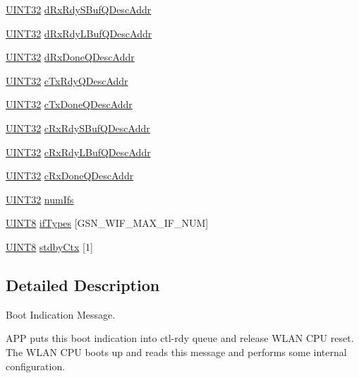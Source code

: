 \begin{DoxyCompactItemize}
\item 
\hyperlink{a00660_gae1e6edbbc26d6fbc71a90190d0266018}{UINT32} \hyperlink{a00348_ab547f820597f1b1f7cbfdd7393569c12}{dRxRdySBufQDescAddr}
\item 
\hyperlink{a00660_gae1e6edbbc26d6fbc71a90190d0266018}{UINT32} \hyperlink{a00348_a26310480a4f804ddac47c8036ed576a0}{dRxRdyLBufQDescAddr}
\item 
\hyperlink{a00660_gae1e6edbbc26d6fbc71a90190d0266018}{UINT32} \hyperlink{a00348_ab8fef41094b77d4a751980b345341c36}{dRxDoneQDescAddr}
\item 
\hyperlink{a00660_gae1e6edbbc26d6fbc71a90190d0266018}{UINT32} \hyperlink{a00348_a1542d73344b14a84e7f710c4de9bb8a7}{cTxRdyQDescAddr}
\item 
\hyperlink{a00660_gae1e6edbbc26d6fbc71a90190d0266018}{UINT32} \hyperlink{a00348_a78a51b81650e81f8eadc7c11f49dcf0b}{cTxDoneQDescAddr}
\item 
\hyperlink{a00660_gae1e6edbbc26d6fbc71a90190d0266018}{UINT32} \hyperlink{a00348_a4c1ebbd82b71958696f47604eb581d7c}{cRxRdySBufQDescAddr}
\item 
\hyperlink{a00660_gae1e6edbbc26d6fbc71a90190d0266018}{UINT32} \hyperlink{a00348_a8abf8636a4f60a8f51ea8857ade542d5}{cRxRdyLBufQDescAddr}
\item 
\hyperlink{a00660_gae1e6edbbc26d6fbc71a90190d0266018}{UINT32} \hyperlink{a00348_aa5ee884cd0421e255598f366d7725088}{cRxDoneQDescAddr}
\item 
\hyperlink{a00660_gae1e6edbbc26d6fbc71a90190d0266018}{UINT32} \hyperlink{a00348_a5d8ffa77e8421c84687b597a75ed84e7}{numIfs}
\item 
\hyperlink{a00660_gab27e9918b538ce9d8ca692479b375b6a}{UINT8} \hyperlink{a00348_a9cbf66db07b0b8d7e92f702d2e6896a8}{ifTypes} \mbox{[}GSN\_\-WIF\_\-MAX\_\-IF\_\-NUM\mbox{]}
\item 
\hyperlink{a00660_gab27e9918b538ce9d8ca692479b375b6a}{UINT8} \hyperlink{a00348_a040b2a18b45a5cfec1663e48692e1167}{stdbyCtx} \mbox{[}1\mbox{]}
\end{DoxyCompactItemize}


\subsection{Detailed Description}
Boot Indication Message. 

APP puts this boot indication into ctl-\/rdy queue and release WLAN CPU reset. The WLAN CPU boots up and reads this message and performs some internal configuration. 

